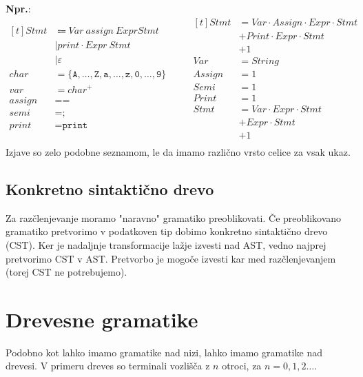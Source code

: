 \documentclass{report}
\newcommand{\Ex}{\textbf{Npr.}:\ }
\newcommand{\Null}{\varepsilon}
\newcommand{\Char}[1]{\texttt{#1}}
\newcommand{\Seq}{\cdot}
\newcommand{\Spc}{\ }
\newcommand{\Union}{\mathrel{|}}
\newcommand{\Sum}{\mathrel{+}}
\newcommand{\KleenePlus}[1]{#1^+}
\newcommand{\Arrow}{\Coloneq}
\newcommand{\NT}[1]{{#1}}
\newcommand{\T}[1]{{#1}}
\begin{document}
\Ex
\begin{equation*}
  \begin{aligned}[t]
    \NT{Stmt} &\Arrow \NT{Var} \Spc \T{assign} \Spc \NT{Expr} \NT{Stmt}\\
    &\Union \T{print} \Seq \NT{Expr} \Spc \NT{Stmt}\\
    &\Union \Null\\[1em]
    \T{char} &= \{\Char{A}, \dots, \Char{Z}, \Char{a}, \dots, \Char{z}, \Char{0}, \dots, \Char{9} \}\\
    \T{var} &= \KleenePlus{\T{char}}\\
    \T{assign} &= \Char{=}\\
    \T{semi} &= \Char{;}\\
    \T{print} &= \Char{print}\\
  \end{aligned}
  \qquad
  \begin{aligned}[t]
    Stmt &= Var \Seq Assign \Seq Expr \Seq Stmt \\
    &\Sum Print \Seq Expr \Seq Stmt \\
    &\Sum 1\\
    Var &= String\\
    Assign &= 1\\
    Semi &= 1\\
    Print &= 1\\[1em]
    Stmt &= Var \Seq Expr \Seq Stmt \\
    &\Sum Expr \Seq Stmt \\
    &\Sum 1\\
  \end{aligned}
\end{equation*}
Izjave so zelo podobne seznamom, le da imamo različno vrsto celice za vsak ukaz.

\section{Konkretno sintaktično drevo}
Za razčlenjevanje moramo "naravno" gramatiko preoblikovati.
Če preoblikovano gramatiko pretvorimo v podatkoven tip dobimo konkretno sintaktično drevo (CST).
Ker je nadaljnje transformacije lažje izvesti nad AST, vedno najprej pretvorimo CST v AST.
Pretvorbo je mogoče izvesti kar med razčlenjevanjem (torej CST ne potrebujemo).

\chapter{Drevesne gramatike}
Podobno kot lahko imamo gramatike nad nizi, lahko imamo gramatike nad drevesi.
V primeru dreves so terminali vozlišča z $n$ otroci, za $n = 0, 1, 2 \dots$.
\end{document}
